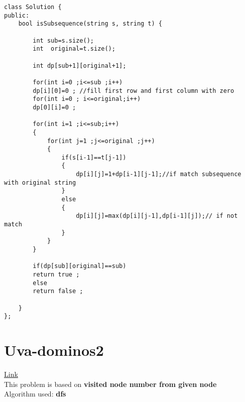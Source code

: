 \documentclass{article}
\begin{document}
\begin{lstlisting}[style=cppStyle]
class Solution {
public:
    bool isSubsequence(string s, string t) {

        int sub=s.size();
        int  original=t.size();
        
        int dp[sub+1][original+1];

        for(int i=0 ;i<=sub ;i++)
        dp[i][0]=0 ; //fill first row and first column with zero
        for(int i=0 ; i<=original;i++)
        dp[0][i]=0 ;

        for(int i=1 ;i<=sub;i++)
        {
            for(int j=1 ;j<=original ;j++)
            {
                if(s[i-1]==t[j-1])
                {
                    dp[i][j]=1+dp[i-1][j-1];//if match subsequence with original string 
                }
                else
                {
                    dp[i][j]=max(dp[i][j-1],dp[i-1][j]);// if not match 
                }
            }
        }

        if(dp[sub][original]==sub)
        return true ;
        else
        return false ;
        
    }
};
\end{lstlisting}

\section{Uva-dominos2} \href{https://onlinejudge.org/index.php?option=com_onlinejudge&Itemid=8&page=show_problem&problem=2513}{Link} \\

This problem is based on  \textbf{  visited node number from given node }\\
Algorithm used: \textbf{dfs}\\
\end{document}
